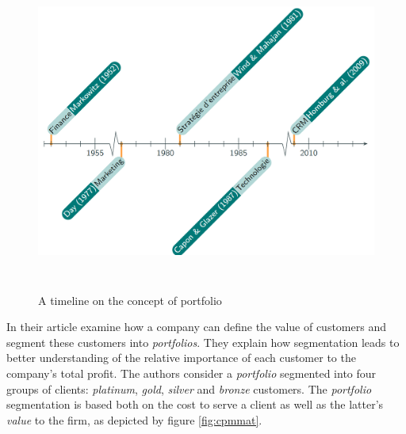\documentclass[
]{book}
\begin{document}
\begin{figure}

{\centering \includegraphics[width=400pt,height=300pt]{./imgs/portfolio_timeline} 

}

\caption{A timeline on the concept of portfolio}\label{fig:timeline}
\end{figure}

In their article \citet{CPM_CRM} examine how a company can define the
value of customers and segment these customers into \emph{portfolios}. They explain how segmentation leads to better understanding of the relative importance of each customer to the company's total profit. The authors consider a \emph{portfolio} segmented into four groups of clients: \emph{platinum}, \emph{gold}, \emph{silver} and \emph{bronze} customers. The \emph{portfolio} segmentation is based both on the cost to serve a client as well as the latter's \emph{value} to the firm, as depicted by figure \ref{fig:cpmmat}.
\end{document}
